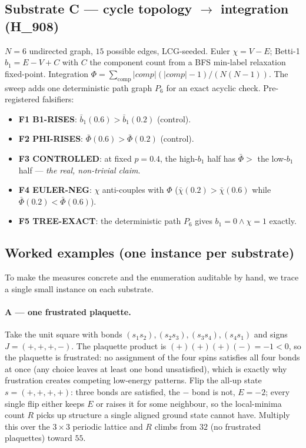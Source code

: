 \documentclass[11pt,a4paper]{article}
\begin{document}
\subsection{Substrate C --- cycle topology $\to$ integration (H\_908)}
$N{=}6$ undirected graph, $15$ possible edges, LCG-seeded. Euler
$\chi = V - E$; Betti-1 $b_1 = E - V + C$ with $C$ the component count from a
BFS min-label relaxation fixed-point. Integration
$\Phi = \sum_{\text{comp}} |comp|(|comp|-1) / (N(N-1))$. The sweep adds one
deterministic path graph $P_6$ for an exact acyclic check. Pre-registered
falsifiers:
\begin{itemize}\itemsep0.15em
  \item \textbf{F1 B1-RISES}: $\bar b_1(0.6) > \bar b_1(0.2)$ (control).
  \item \textbf{F2 PHI-RISES}: $\bar\Phi(0.6) > \bar\Phi(0.2)$ (control).
  \item \textbf{F3 CONTROLLED}: at fixed $p{=}0.4$, the high-$b_1$ half has
        $\bar\Phi >$ the low-$b_1$ half --- \emph{the real, non-trivial claim}.
  \item \textbf{F4 EULER-NEG}: $\chi$ anti-couples with $\Phi$
        ($\bar\chi(0.2) > \bar\chi(0.6)$ while $\bar\Phi(0.2) < \bar\Phi(0.6)$).
  \item \textbf{F5 TREE-EXACT}: the deterministic path $P_6$ gives
        $b_1 = 0 \wedge \chi = 1$ exactly.
\end{itemize}

\subsection{Worked examples (one instance per substrate)}
\label{sec:worked}
To make the measures concrete and the enumeration auditable by hand, we trace a
single small instance on each substrate.

\paragraph{A --- one frustrated plaquette.}
Take the unit square with bonds $(s_1 s_2), (s_2 s_3), (s_3 s_4), (s_4 s_1)$ and
signs $J = (+,+,+,-)$. The plaquette product is
$(+)(+)(+)(-) = -1 < 0$, so the plaquette is frustrated: no assignment of the
four spins satisfies all four bonds at once (any choice leaves at least one bond
unsatisfied), which is exactly why frustration creates competing low-energy
patterns. Flip the all-up state $s=(+,+,+,+)$: three bonds are satisfied, the
$-$ bond is not, $E = -2$; every single flip either keeps $E$ or raises it for
some neighbour, so the local-minima count $R$ picks up structure a single
aligned ground state cannot have. Multiply this over the $3{\times}3$ periodic
lattice and $R$ climbs from $32$ (no frustrated plaquettes) toward $55$.
\end{document}
